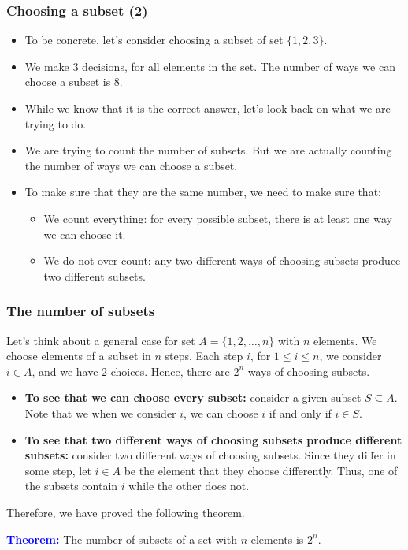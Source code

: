 \begin{frame}\frametitle{Choosing a subset (2)}
  \begin{itemize}
  \item To be concrete, let's consider choosing a subset of set
    $\{1,2,3\}$.
  \item We make 3 decisions, for all elements in the set.  The number
    of ways we can choose a subset is 8.
  \item While we know that it is the correct answer, let's look back
    on what we are trying to do. \pause
  \item We are trying to count the number of subsets. \pause But we
    are actually counting the number of ways we can choose a subset.
  \item To make sure that they are the same number, we need to make
    sure that: \pause
    \begin{itemize}
    \item We count everything: for every possible subset, there is at
      least one way we can choose it.
    \item We do not over count: any two different ways of choosing
      subsets produce two different subsets.
    \end{itemize}
  \end{itemize}
\end{frame}

\begin{frame}\frametitle{The number of subsets}
  Let's think about a general case for set $A=\{1,2,\ldots,n\}$ with
  $n$ elements.  \pause We choose elements of a subset in $n$ steps.
  Each step $i$, for $1\leq i\leq n$, we consider $i\in A$, and we
  have $2$ choices.  \pause Hence, there are $2^n$ ways of choosing
  subsets.
  {\small
    \begin{itemize}
    \item {\bf To see that we can choose every subset:} \pause
      consider a given subset $S\subseteq A$.  Note that we when we
      consider $i$, we can choose $i$ if and only if $i\in S$.  \pause
    \item {\bf To see that two different ways of choosing subsets
      produce different subsets:} \pause consider two different ways
      of choosing subsets.  Since they differ in some step, let $i\in
      A$ be the element that they choose differently.  Thus, one of
      the subsets contain $i$ while the other does not.
    \end{itemize}
  }
  \pause

  Therefore, we have proved the following theorem.

  \begin{tcolorbox}
    {\bf \textcolor{blue}{Theorem:}} The number of subsets of a set with
    $n$ elements is $2^n$.
  \end{tcolorbox}
\end{frame}
